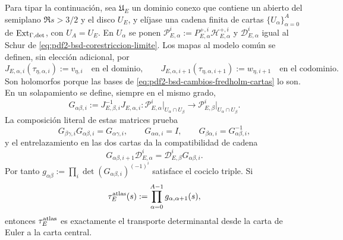 Para tipar la continuación, sea $\mathfrak U_E$ un dominio conexo que contiene
un abierto del semiplano $\Re s>3/2$ y el disco $U_E$, y elíjase una cadena
finita de cartas $\{U_\alpha\}_{\alpha=0}^A$ de
$\operatorname{Ext}_{\Gamma,{\rm det}}$, con $U_A=U_E$. En $U_\alpha$ se
ponen
$\mathscr P_{E,\alpha}^i:=
P_{E,\alpha}^{+,i}\mathscr H_{E,\alpha}^{+,i}$ y
$\mathscr D_{E,\alpha}^i$ igual al Schur de
\eqref{eq:pdf2-bsd-corestriccion-limite}. Los mapas al modelo común se
definen, sin elección adicional, por
\begin{equation}\label{eq:pdf2-bsd-j-cartas-modelo-comun}
 J_{E,\alpha,i}(\tau_{\eta,\alpha,i}):=v_{\eta,i}
 \quad\text{en el dominio},
 \qquad
 J_{E,\alpha,i+1}(\tau_{\eta,\alpha,i+1}):=w_{\eta,i+1}
 \quad\text{en el codominio}.
\end{equation}
Son holomorfos porque las bases de
\eqref{eq:pdf2-bsd-cambios-fredholm-cartas} lo son. En un solapamiento se
define, siempre en el mismo grado,
\begin{equation}\label{eq:pdf2-bsd-transiciones-atlas}
 G_{\alpha\beta,i}:=J_{E,\beta,i}^{-1}J_{E,\alpha,i}:
 \mathscr P_{E,\alpha}^i\big|_{U_\alpha\cap U_\beta}
 \longrightarrow
 \mathscr P_{E,\beta}^i\big|_{U_\alpha\cap U_\beta}.
\end{equation}
La composición literal de estas matrices prueba
\begin{equation}\label{eq:pdf2-bsd-cociclo-atlas}
 G_{\beta\gamma,i}G_{\alpha\beta,i}=G_{\alpha\gamma,i},
 \qquad G_{\alpha\alpha,i}=I,
 \qquad G_{\beta\alpha,i}=G_{\alpha\beta,i}^{-1},
\end{equation}
y el entrelazamiento en las dos cartas da la compatibilidad de cadena
\begin{equation}\label{eq:pdf2-bsd-cociclo-cadena}
 G_{\alpha\beta,i+1}\mathscr D_{E,\alpha}^i
 =\mathscr D_{E,\beta}^iG_{\alpha\beta,i}.
\end{equation}
Por tanto
$g_{\alpha\beta}:=\prod_i\det(G_{\alpha\beta,i})^{(-1)^i}$ satisface el
cociclo triple. Si
\begin{equation}\label{eq:pdf2-bsd-tau-atlas}
 \tau_E^{\rm atlas}(s):=
 \prod_{\alpha=0}^{A-1}g_{\alpha,\alpha+1}(s),
\end{equation}
entonces $\tau_E^{\rm atlas}$ es exactamente el transporte determinantal
desde la carta de Euler a la carta central.


